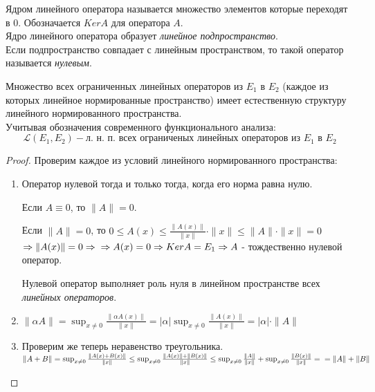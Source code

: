 \begin{definition}
    Ядром линейного оператора называется множество элементов которые переходят в 0. Обозначается $Ker A$ для оператора $A$. \\
    Ядро линейного оператора образует \textit{линейное подпространство}. \\ 
    Если подпространство совпадает с линейным пространством, то такой оператор называется \textit{нулевым}.
\end{definition}

\begin{theorem}
    Множество всех ограниченных линейных операторов из $E_1$ в $E_2$ (каждое из которых линейное нормированные пространство) имеет естественную структуру линейного нормированного пространства. \\
    Учитывая обозначения современного функционального анализа: \[\mathcal{L}(E_1, E_2) - \text{л. н. п. всех ограниченых линейных операторов из $E_1$ в $E_2$}\]
\end{theorem}

\begin{proof}
    Проверим каждое из условий линейного нормированного пространства:   
    \begin{enumerate} 
        \item 
        Оператор нулевой тогда и только тогда, когда его норма равна нулю.
    
        Если $A \equiv 0$, то $\|A\| = 0$. 
        
        Если $\| A \| = 0$, то $0 \leq A(x) \leq \frac{\|A(x)\|}{\|x\|} \cdot \|x\| \leq \|A\| \cdot \|x\| = 0$ $\Rightarrow \| A(x) \| = 0 \Rightarrow \\ \Rightarrow A(x) = 0 \Rightarrow Ker A = E_1 \Rightarrow A$ - тождественно нулевой оператор.

        Нулевой оператор выполняет роль нуля в линейном пространстве всех \textit{линейных операторов}.
        \item $\| \alpha A \| = \sup_{x \neq 0}{\frac{\|\alpha A(x)\|}{\|x\|}} = |\alpha| \sup_{x \neq 0}{\frac{\|A(x)\|}{\|x\|}} = |\alpha| \cdot \|A\|$
        \item Проверим же теперь неравенство треугольника.\\
        $\| A + B \| = \sup_{x \neq 0}{\frac{\| A(x) + B(x) \|}{\|x\|}} \leq \sup_{x \neq 0}{\frac{\|A(x)\| + \|B(x)\|}{\|x\|}} \leq \sup_{x \neq 0}{\frac{\|A\|}{\|x\|}} + \sup_{x \neq 0}{\frac{\|B(x)\|}{\|x\|}} = \\ = \|A\| + \|B\|$
    \end{enumerate}
\end{proof}


